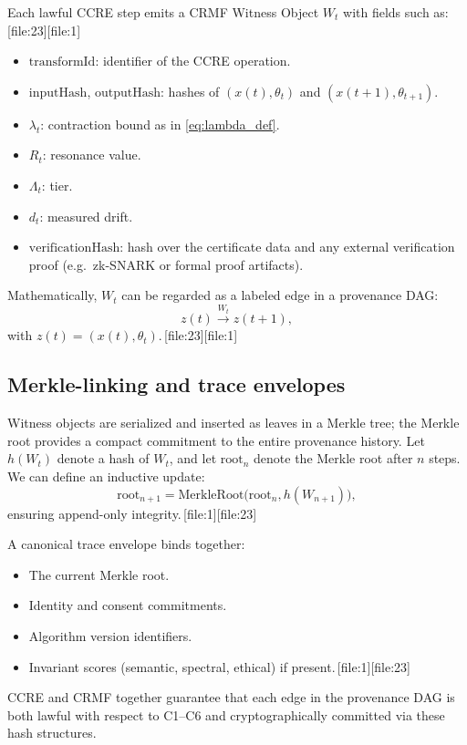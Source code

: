 \documentclass[11pt]{article}
\begin{document}
Each lawful CCRE step emits a CRMF Witness Object $W_t$ with fields such as:\,[file:23][file:1]
\begin{itemize}[leftmargin=1.5em]
  \item $\mathrm{transformId}$: identifier of the CCRE operation.
  \item $\mathrm{inputHash}$, $\mathrm{outputHash}$: hashes of $(x(t),\theta_t)$ and $(x(t+1),\theta_{t+1})$.
  \item $\lambda_t$: contraction bound as in \eqref{eq:lambda_def}.
  \item $R_t$: resonance value.
  \item $\Lambda_t$: tier.
  \item $d_t$: measured drift.
  \item $\mathrm{verificationHash}$: hash over the certificate data and any external verification proof (e.g.\ zk-SNARK or formal proof artifacts).
\end{itemize}
Mathematically, $W_t$ can be regarded as a labeled edge in a provenance DAG:
\[
  z(t) \xrightarrow{W_t} z(t+1),
\]
with $z(t)=(x(t),\theta_t)$.\,[file:23][file:1]

\subsection{Merkle-linking and trace envelopes}

Witness objects are serialized and inserted as leaves in a Merkle tree; the Merkle root provides a compact commitment to the entire provenance history.
Let $h(W_t)$ denote a hash of $W_t$, and let $\mathrm{root}_n$ denote the Merkle root after $n$ steps.
We can define an inductive update:
\[
  \mathrm{root}_{n+1} = \mathrm{MerkleRoot}\bigl(\mathrm{root}_n, h(W_{n+1})\bigr),
\]
ensuring append-only integrity.\,[file:1][file:23]

A canonical trace envelope binds together:
\begin{itemize}[leftmargin=1.5em]
  \item The current Merkle root.
  \item Identity and consent commitments.
  \item Algorithm version identifiers.
  \item Invariant scores (semantic, spectral, ethical) if present.\,[file:1][file:23]
\end{itemize}
CCRE and CRMF together guarantee that each edge in the provenance DAG is both lawful with respect to C1--C6 and cryptographically committed via these hash structures.
\end{document}
